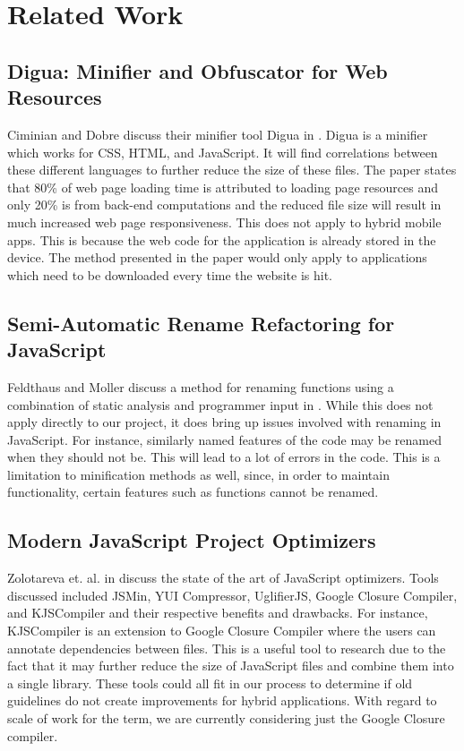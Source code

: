 \documentclass{acm_proc_article-sp}
\begin{document}
\section{Related Work}
\subsection{Digua: Minifier and Obfuscator for Web Resources \cite{ciminiandigua}}
Ciminian and Dobre discuss their minifier tool Digua in \cite{ciminiandigua}. 
Digua is a minifier which works for CSS, HTML, and JavaScript.  
It will find correlations between these different languages to further reduce the size of these files.
The paper states that 80\% of web page loading time is attributed to loading page resources and only 20\% is from back-end computations and the reduced file size will result in much increased web page responsiveness.
This does not apply to hybrid mobile apps.
This is because the web code for the application is already stored in the device.
The method presented in the paper would only apply to applications which need to be downloaded every time the website is hit. 

\subsection{Semi-Automatic Rename Refactoring for JavaScript \cite{feldthaus2013semi}}
Feldthaus and Moller discuss a method for renaming functions using a combination of static analysis and programmer input in \cite{feldthaus2013semi}.
While this does not apply directly to our project, it does bring up issues involved with renaming in JavaScript.
For instance, similarly named features of the code may be renamed when they should not be.
This will lead to a lot of errors in the code.
This is a limitation to minification methods as well, since, in order to maintain functionality, certain features such as functions cannot be renamed.

\subsection{Modern JavaScript Project Optimizers \cite{zolotareva2014modern}}
Zolotareva et. al. in \cite{zolotareva2014modern} discuss the state of the art of JavaScript optimizers.
Tools discussed included JSMin, YUI Compressor, UglifierJS, Google Closure Compiler, and KJSCompiler and their respective benefits and drawbacks.
For instance, KJSCompiler is an extension to Google Closure Compiler where the users can annotate dependencies between files.
This is a useful tool to research due to the fact that it may further reduce the size of JavaScript files and combine them into a single library.
These tools could all fit in our process to determine if old guidelines do not create improvements for hybrid applications.
With regard to scale of work for the term, we are currently considering just the Google Closure compiler.
\end{document}
